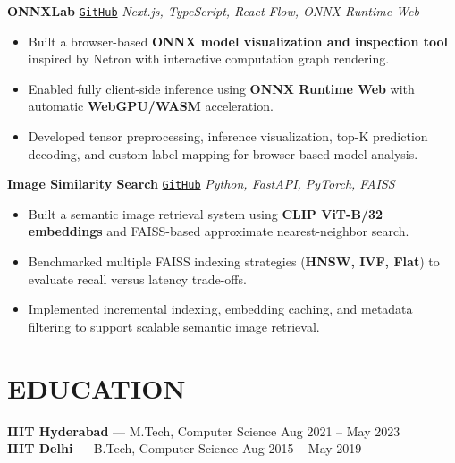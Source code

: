 \documentclass[a4paper,7.5pt]{extarticle}
\begin{document}
\vspace{1pt}

\noindent
\textbf{ONNXLab}
\href{https://github.com/kshitijqwerty/onnxlab}{\texttt{GitHub}}
\hfill
\textit{Next.js, TypeScript, React Flow, ONNX Runtime Web}
\begin{itemize}
    \item Built a browser-based \textbf{ONNX model visualization and inspection tool} inspired by Netron with interactive computation graph rendering.
    \item Enabled fully client-side inference using \textbf{ONNX Runtime Web} with automatic \textbf{WebGPU/WASM} acceleration.
    \item Developed tensor preprocessing, inference visualization, top-K prediction decoding, and custom label mapping for browser-based model analysis.
\end{itemize}

\vspace{1pt}

\noindent
\textbf{Image Similarity Search}
\href{https://github.com/kshitijqwerty/image-search-faiss}{\texttt{GitHub}}
\hfill
\textit{Python, FastAPI, PyTorch, FAISS}
\begin{itemize}
    \item Built a semantic image retrieval system using \textbf{CLIP ViT-B/32 embeddings} and FAISS-based approximate nearest-neighbor search.
    \item Benchmarked multiple FAISS indexing strategies (\textbf{HNSW, IVF, Flat}) to evaluate recall versus latency trade-offs.
    \item Implemented incremental indexing, embedding caching, and metadata filtering to support scalable semantic image retrieval.
\end{itemize}


\section*{EDUCATION}
\small
\noindent
\textbf{IIIT Hyderabad} --- M.Tech, Computer Science \hfill Aug 2021 -- May 2023\\
\textbf{IIIT Delhi} --- B.Tech, Computer Science \hfill Aug 2015 -- May 2019
\end{document}

